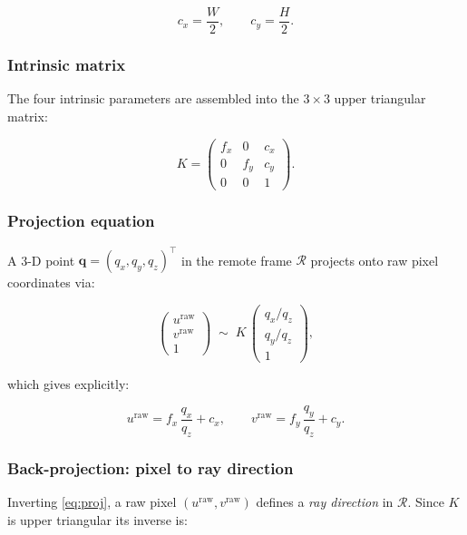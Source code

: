 \documentclass[12pt, a4paper]{article}
\begin{document}
\begin{equation}
c_x = \frac{W}{2}, \qquad c_y = \frac{H}{2}.
\end{equation}

\subsubsection{Intrinsic matrix}
The four intrinsic parameters are assembled into the $3\times 3$ upper
triangular matrix:

\begin{equation}
K =
\begin{pmatrix}
f_x & 0   & c_x \\
0   & f_y & c_y \\
0   & 0   & 1
\end{pmatrix}.
\label{eq:K}
\end{equation}

\subsubsection{Projection equation}
A 3-D point $\mathbf{q} = (q_x, q_y, q_z)^\top$ in the remote frame
$\mathcal{R}$ projects onto raw pixel coordinates via:

\begin{equation}
\begin{pmatrix} u^{\text{raw}} \\ v^{\text{raw}} \\ 1 \end{pmatrix}
\;\sim\;
K\,\begin{pmatrix} q_x/q_z \\ q_y/q_z \\ 1 \end{pmatrix},
\end{equation}

which gives explicitly:

\begin{equation}
u^{\text{raw}} = f_x\,\frac{q_x}{q_z} + c_x,
\qquad
v^{\text{raw}} = f_y\,\frac{q_y}{q_z} + c_y.
\label{eq:proj}
\end{equation}

\subsubsection{Back-projection: pixel to ray direction}
Inverting \eqref{eq:proj}, a raw pixel $(u^{\text{raw}}, v^{\text{raw}})$
defines a \emph{ray direction} in $\mathcal{R}$. Since $K$ is upper
triangular its inverse is:
\end{document}
